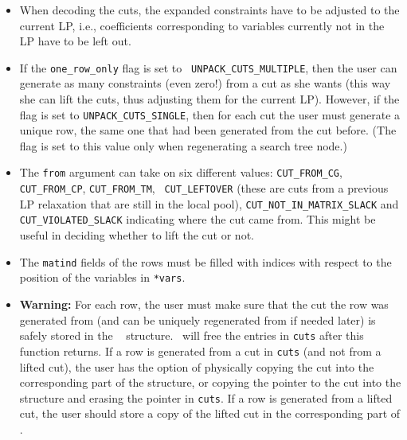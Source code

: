 \begin{itemize}

\item When decoding the cuts, the expanded constraints have to be adjusted to
the current LP, i.e., coefficients corresponding to variables currently not in
the LP have to be left out.

\item If the {\tt one\_row\_only} flag is set to {\tt
UNPACK\_CUTS\_MULTIPLE}, then the user can generate as many
constraints (even zero!) from a cut as she wants (this way she can
lift the cuts, thus adjusting them for the current LP).
However, if the flag is set to {\tt UNPACK\_CUTS\_SINGLE}, then for
each cut the user must generate a unique row, the same one that had
been generated from the cut before. (The flag is set to this value
only when regenerating a search tree node.)

\item The {\tt from} argument can take on six different values:
{\tt CUT\_FROM\_CG}, {\tt CUT\_FROM\_CP}, {\tt CUT\_FROM\_TM}, {\tt
CUT\_LEFTOVER} (these are cuts from a previous LP relaxation that are
still in the local pool), {\tt CUT\_NOT\_IN\_MATRIX\_SLACK} and {\tt
CUT\_VIOLATED\_SLACK} indicating where the cut came from. This might
be useful in deciding whether to lift the cut or not.

\item The {\tt matind} fields of the rows must be filled with indices with
respect to the position of the variables in {\tt **vars}.

\item {\bf Warning:} For each row, the user must make sure that the
cut the row was generated from (and can be uniquely regenerated from
if needed later) is safely stored in the {\tt 
{}} structure. \BB\ will free the entries in
{\tt cuts} after this function returns. If a row is generated from a
cut in {\tt cuts} (and not from a lifted cut), the user has the option
of physically copying the cut into the corresponding part of the
{\tt {}} structure, or copying the
pointer to the cut into the {\tt {}}
structure and erasing the pointer in {\tt cuts}. If a row is generated
from a lifted cut, the user should store a copy of the lifted cut in
the corresponding part of {\tt {}}.

\end{itemize}

